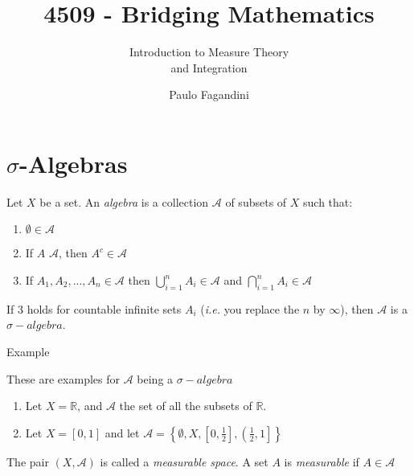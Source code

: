 \documentclass[aspectratio=169]{beamer}
\title[]{4509 - Bridging Mathematics}
\subtitle{Introduction to Measure Theory\\ and Integration}
\author[P. Fagandini]{Paulo Fagandini}
\institute{}
\date{}
\begin{document}
\section{$\sigma$-Algebras}

\begin{frame}
   \begin{definition}
        Let $X$ be a set. An \textit{algebra} is a collection $\mathcal{A}$ of subsets of $X$ such that:
        \begin{enumerate}
            \item $\emptyset \in \mathcal{A}$
            \item If $A$ \in $\mathcal{A}$, then $A^c\in\mathcal{A}$
            \item If $A_1,A_2,...,A_n\in\mathcal{A}$ then $\bigcup_{i=1}^n A_i\in\mathcal{A}$ and $\bigcap_{i=1}^n A_i\in\mathcal{A}$
        \end{enumerate}
        If 3 holds for countable infinite sets $A_i$ (\textit{i.e.} you replace the $n$ by $\infty$), then $\mathcal{A}$ is a $\sigma-algebra$.
   \end{definition}
\end{frame}

\begin{frame}{Example}

    These are examples for $\mathcal{A}$ being a $\sigma-algebra$

    \begin{enumerate}
        \item<1-> Let $X=\mathds{R}$, and $\mathcal{A}$ the set of all the subsets of $\mathds{R}$.
        \item<2-> Let $X=[0,1]$ and let $\mathcal{A}=\left\{\emptyset, X, \left[0,\frac{1}{2}\right], \left(\frac{1}{2},1\right]\right\}$
    \end{enumerate}
\end{frame}

\begin{frame}
    \begin{definition}
        The pair $(X,\mathcal{A})$ is called a \textit{measurable space}. A set $A$ is \textit{measurable} if $A\in\mathcal{A}$    
    \end{definition}
\end{frame}
\end{document}
